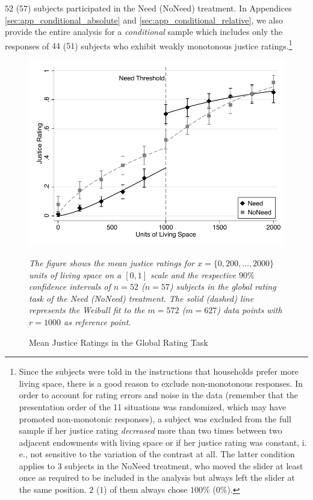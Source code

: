 \documentclass[12pt]{scrartcl}
\begin{document}
$52$ ($57$) subjects participated in the Need (NoNeed) treatment.
In Appendices \ref{sec:app_conditional_absolute} and \ref{sec:app_conditional_relative}, we also provide the entire analysis for a \textit{conditional} sample which includes only the responses of $44$ ($51$) subjects who exhibit weakly monotonous justice ratings.\footnote{Since the subjects were told in the instructions that households prefer more living space, there is a good reason to exclude non-monotonous responses. In order to account for rating errors and noise in the data (remember that the presentation order of the 11 situations was randomized, which may have promoted non-monotonic responses), a subject was excluded from the full sample if her justice rating \textit{decreased} more than two times between two adjacent endowments with living space or if her justice rating was constant, i.\,e., not sensitive to the variation of the contrast at all. The latter condition applies to $3$ subjects in the NoNeed treatment, who moved the slider at least once as required to be included in the analysis but always left the slider at the same position. $2$ ($1$) of them always chose $100\%$ ($0\%$).}

\begin{figure}[ht!]
   \centering
   \includegraphics{figures/figure_1.pdf}
   \begin{minipage}{\linewidth}
      \footnotesize
      \textit{The figure shows the mean justice ratings for $x=\{0,200,\ldots,2000\}$ units of living space on a $[0,1]$ scale and the respective $90\%$ confidence intervals of $n=52$ ($n=57$) subjects in the global rating task of the Need (NoNeed) treatment. The solid (dashed) line represents the Weibull fit to the $m=572$ ($m=627$) data points with $r=1000$ as reference point.}
   \end{minipage}
   \caption{Mean Justice Ratings in the Global Rating Task}
   \label{fig:global_ratings_full}
\end{figure}
\end{document}
